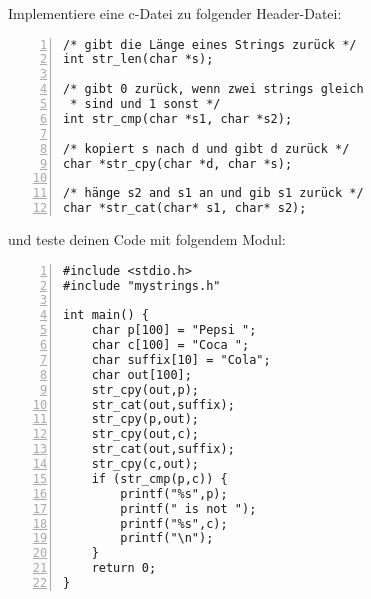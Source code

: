\begin{aufg} Implementiere eine c-Datei zu folgender Header-Datei: 
\begin{codelisting}
\begin{lstlisting}[numbers=left,numberstyle=\tiny,frame=tlrb]
/* gibt die Länge eines Strings zurück */
int str_len(char *s); 

/* gibt 0 zurück, wenn zwei strings gleich 
 * sind und 1 sonst */
int str_cmp(char *s1, char *s2);

/* kopiert s nach d und gibt d zurück */
char *str_cpy(char *d, char *s);

/* hänge s2 and s1 an und gib s1 zurück */ 
char *str_cat(char* s1, char* s2);
\end{lstlisting}
\end{codelisting}
und teste deinen Code mit folgendem Modul:
\begin{codelisting}
\begin{lstlisting}[numbers=left,numberstyle=\tiny,frame=tlrb]
#include <stdio.h>
#include "mystrings.h"

int main() {
	char p[100] = "Pepsi ";
	char c[100] = "Coca ";
	char suffix[10] = "Cola";
	char out[100];
	str_cpy(out,p); 
	str_cat(out,suffix); 
	str_cpy(p,out);
	str_cpy(out,c);
	str_cat(out,suffix);
	str_cpy(c,out);
	if (str_cmp(p,c)) {
		printf("%s",p);
		printf(" is not ");
		printf("%s",c);
		printf("\n");
	}
	return 0;
}
\end{lstlisting}
\end{codelisting}
\end{aufg}
